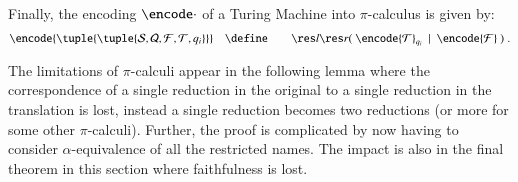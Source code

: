 \documentclass[submission,copyright,creativecommons]{eptcs}
\def\BNF{\ \  | \ \  }
\newcommand{\tmach}[1]{\tuple{\tuple{#1}}}
\begin{document}
Finally, the encoding $\encode\cdot$ of a Turing Machine into 
$\pi$-calculus is given by:
\begin{eqnarray*}
\encode{\tmach{{\mathcal S}, {\mathcal Q}, {\mathcal F}, {\mathcal T}, q_i}}
&\quad\define\quad&
\res l\res r (\ \encode {\mathcal T}_{q_i}
\BNF
\encode{\mathcal F}\ )\; .
\end{eqnarray*}

The limitations of $\pi$-calculi appear in the following lemma where the correspondence
of a single reduction in the original to a single reduction in the translation is lost,
instead a single reduction becomes two reductions (or more for some other $\pi$-calculi).
Further, the proof is complicated by now having to consider $\alpha$-equivalence of all
the restricted names.
The impact is also in the final theorem in this section where faithfulness is lost.
\end{document}
